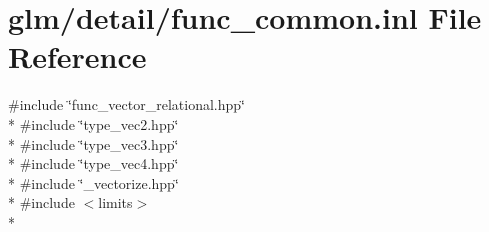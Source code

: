 \hypertarget{func__common_8inl}{\section{glm/detail/func\-\_\-common.inl File Reference}
\label{func__common_8inl}
}
{\ttfamily \#include \char`\"{}func\-\_\-vector\-\_\-relational.\-hpp\char`\"{}}\\*
{\ttfamily \#include \char`\"{}type\-\_\-vec2.\-hpp\char`\"{}}\\*
{\ttfamily \#include \char`\"{}type\-\_\-vec3.\-hpp\char`\"{}}\\*
{\ttfamily \#include \char`\"{}type\-\_\-vec4.\-hpp\char`\"{}}\\*
{\ttfamily \#include \char`\"{}\-\_\-vectorize.\-hpp\char`\"{}}\\*
{\ttfamily \#include $<$limits$>$}\\*
